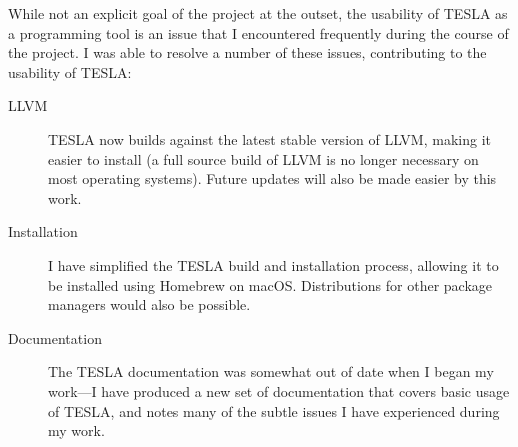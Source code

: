 While not an explicit goal of the project at the outset, the usability of TESLA
as a programming tool is an issue that I encountered frequently during the
course of the project. I was able to resolve a number of these issues,
contributing to the usability of TESLA:
\begin{description}
  \item[LLVM] TESLA now builds against the latest stable version of LLVM, making
    it easier to install (a full source build of LLVM is no longer necessary on
    most operating systems). Future updates will also be made easier by this work.

  \item[Installation] I have simplified the TESLA build and installation
    process, allowing it to be installed using
    Homebrew \cite{_homebrew_????} on macOS. Distributions for
    other package managers would also be possible.

  \item[Documentation] The TESLA documentation was somewhat out of date when I
    began my work---I have produced a new set of documentation that covers basic
    usage of TESLA, and notes many of the subtle issues I have experienced
    during my work.
\end{description}
